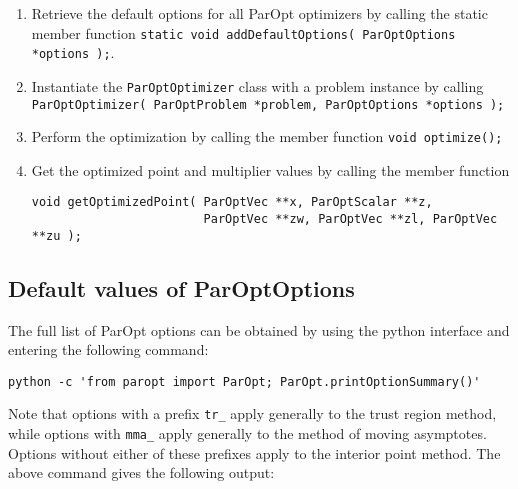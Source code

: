 \documentclass[12pt]{article}
\begin{document}
\begin{enumerate}
\item Retrieve the default options for all ParOpt optimizers by calling the static member function
\texttt{static void addDefaultOptions( ParOptOptions *options );}.

\item Instantiate the \texttt{ParOptOptimizer} class with a problem instance by calling \texttt{ParOptOptimizer( ParOptProblem *problem, ParOptOptions *options );}

\item Perform the optimization by calling the member function \texttt{void optimize();}

\item Get the optimized point and multiplier values by calling the member function
\begin{verbatim}
void getOptimizedPoint( ParOptVec **x, ParOptScalar **z,
                        ParOptVec **zw, ParOptVec **zl, ParOptVec **zu );
\end{verbatim}
\end{enumerate}

\subsection{Default values of ParOptOptions}

The full list of ParOpt options can be obtained by using the python interface and entering the following command:
\begin{verbatim}
python -c 'from paropt import ParOpt; ParOpt.printOptionSummary()'
\end{verbatim}
%
Note that options with a prefix \texttt{tr\_} apply generally to the trust region method, while options with \texttt{mma\_} apply generally to the method of moving asymptotes.
Options without either of these prefixes apply to the interior point method.
The above command gives the following output:
\end{document}
